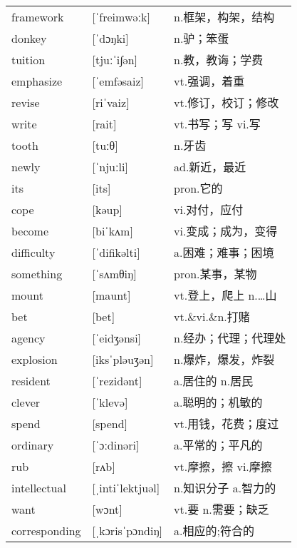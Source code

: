 \documentclass[a4paper]{article}
\begin{document}
\section{}
\begin{tabular}{l l l}

framework & [ˈfreimwəːk] & n.框架，构架，结构 \\
donkey & [ˈdɔŋki] & n.驴；笨蛋 \\
tuition & [tjuːˈi∫ən] & n.教，教诲；学费 \\
emphasize & [ˈemfəsaiz] & vt.强调，着重 \\
revise & [riˈvaiz] & vt.修订，校订；修改 \\
write & [rait] & vt.书写；写 vi.写 \\
tooth & [tuːθ] & n.牙齿 \\
newly & [ˈnjuːli] & ad.新近，最近 \\
its & [its] & pron.它的 \\
cope & [kəup] & vi.对付，应付 \\
become & [biˈkʌm] & vi.变成；成为，变得 \\
difficulty & [ˈdifikəlti] & a.困难；难事；困境 \\
something & [ˈsʌmθiŋ] & pron.某事，某物 \\
mount & [maunt] & vt.登上，爬上 n.…山 \\
bet & [bet] & vt.\&vi.\&n.打赌 \\
agency & [ˈeidʒənsi] & n.经办；代理；代理处 \\
explosion & [iksˈpləuʒən] & n.爆炸，爆发，炸裂 \\
resident & [ˈrezidənt] & a.居住的 n.居民 \\
clever & [ˈklevə] & a.聪明的；机敏的 \\
spend & [spend] & vt.用钱，花费；度过 \\
ordinary & [ˈɔːdinəri] & a.平常的；平凡的 \\
rub & [rʌb] & vt.摩擦，擦 vi.摩擦 \\
intellectual & [ˌintiˈlektjuəl] & n.知识分子 a.智力的 \\
want & [wɔnt] & vt.要 n.需要；缺乏 \\
corresponding & [ˌkɔrisˈpɔndiŋ] & a.相应的;符合的 \\

\end{tabular}
\end{document}
